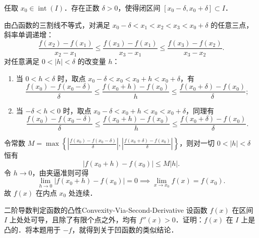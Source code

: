 \begin{myproof}
    任取 $x_0 \in \operatorname{int}(I)$．存在正数 $\delta > 0$，使得闭区间 $[x_0 - \delta, x_0 + \delta] \subset I$．

    由凸函数的三割线不等式，对满足 $x_0 - \delta < x_1 < x_2 < x_3 < x_0 + \delta$ 的任意三点，斜率单调递增：
    \begin{equation}
        \frac{f(x_2) - f(x_1)}{x_2 - x_1} \leqslant \frac{f(x_3) - f(x_1)}{x_3 - x_1} \leqslant \frac{f(x_3) - f(x_2)}{x_3 - x_2}.
    \end{equation}
    对任意满足 $0 < |h| < \delta$ 的改变量 $h$：
    \begin{enumerate}
        \item 当 $0 < h < \delta$ 时，取点 $x_0 - \delta < x_0 < x_0 + h < x_0 + \delta$，有
              \begin{equation}
                  \frac{f(x_0) - f(x_0 - \delta)}{\delta} \leqslant \frac{f(x_0 + h) - f(x_0)}{h} \leqslant \frac{f(x_0 + \delta) - f(x_0)}{\delta};
              \end{equation}
        \item 当 $-\delta < h < 0$ 时，取点 $x_0 - \delta < x_0 + h < x_0 < x_0 + \delta$，同理有
              \begin{equation}
                  \frac{f(x_0) - f(x_0 - \delta)}{\delta} \leqslant \frac{f(x_0 + h) - f(x_0)}{h} \leqslant \frac{f(x_0 + \delta) - f(x_0)}{\delta}.
              \end{equation}
    \end{enumerate}
    令常数 $M = \max\left\{ \left| \frac{f(x_0) - f(x_0 - \delta)}{\delta} \right|, \left| \frac{f(x_0 + \delta) - f(x_0)}{\delta} \right| \right\}$，则对一切 $0 < |h| < \delta$ 恒有
    \begin{equation}
        |f(x_0 + h) - f(x_0)| \leqslant M |h|.
    \end{equation}
    令 $h \to 0$，由夹逼准则可得
    \begin{equation}
        \lim_{h\to 0} |f(x_0 + h) - f(x_0)| = 0 \implies \lim_{x\to x_0} f(x) = f(x_0).
    \end{equation}
    故 $f(x)$ 在内点 $x_0$ 处连续．
\end{myproof}

\begin{problem}{二阶导数判定函数的凸性}{Convexity-Via-Second-Derivative}
    设函数 $f(x)$ 在区间 $I$ 上处处可导，且除了有限个点之外，均有 $f''(x) > 0$．证明：$f(x)$ 在 $I$ 上是凸的．将本题用于 $-f$，就得到关于凹函数的类似结论．
\end{problem}

